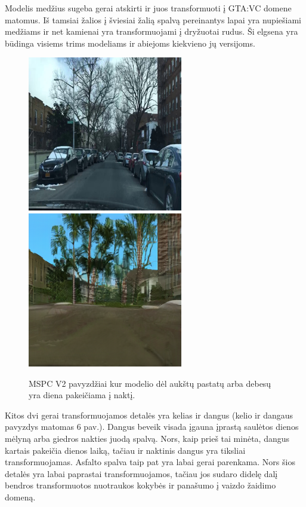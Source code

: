 \documentclass{VUMIFPSkursinis}
\begin{document}
        Modelis medžius sugeba gerai atskirti ir juos transformuoti į GTA:VC domene matomus. Iš tamsiai žalios į šviesiai žalią spalvą pereinantys lapai yra nupiešiami medžiams ir net kamienai yra transformuojami į dryžuotai rudus. Ši elgsena yra būdinga visiems trims modeliams ir abiejoms kiekvieno jų versijoms.
        \begin{figure}[H]
            \centering
            \includegraphics[scale=0.6]{img/palmiu_real}
            \includegraphics[scale=0.6]{img/palmiu_fake}
            \caption{MSPC V2 pavyzdžiai kur modelio dėl aukštų pastatų arba debesų yra diena  pakeičiama į naktį.}
            \label{img:mlp}
        \end{figure}

        Kitos dvi gerai transformuojamos detalės yra kelias ir dangus (kelio ir dangaus pavyzdys matomas 6 pav.). Dangus beveik visada įgauna įprastą saulėtos dienos mėlyną arba giedros nakties juodą spalvą. Nors, kaip prieš tai minėta, dangus kartais pakeičia dienos laiką, tačiau ir naktinis dangus yra tiksliai transformuojamas.
        Asfalto spalva taip pat yra labai gerai parenkama. Nors šios detalės yra labai paprastai transformuojamos, tačiau jos sudaro didelę dalį bendros transformuotos nuotraukos kokybės ir panašumo į vaizdo žaidimo domeną.
\end{document}
